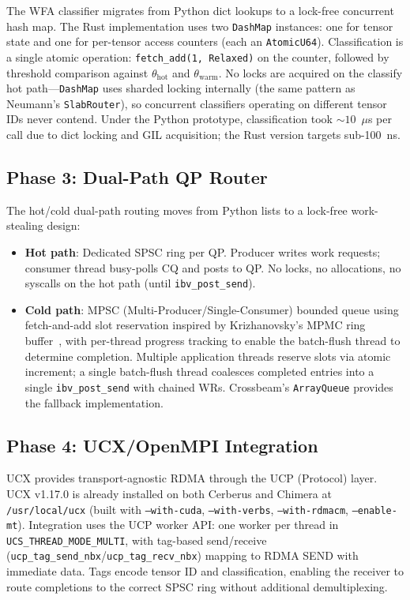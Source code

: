 \documentclass[11pt,letterpaper]{article}
\begin{document}
The WFA classifier migrates from Python dict lookups to a lock-free concurrent hash map. The Rust implementation uses two \texttt{DashMap} instances: one for tensor state and one for per-tensor access counters (each an \texttt{AtomicU64}). Classification is a single atomic operation: \texttt{fetch\_add(1, Relaxed)} on the counter, followed by threshold comparison against $\theta_{\text{hot}}$ and $\theta_{\text{warm}}$. No locks are acquired on the classify hot path---\texttt{DashMap} uses sharded locking internally (the same pattern as Neumann's \texttt{SlabRouter}), so concurrent classifiers operating on different tensor IDs never contend. Under the Python prototype, classification took ${\sim}10$~$\mu$s per call due to dict locking and GIL acquisition; the Rust version targets sub-100~ns.

\subsection{Phase 3: Dual-Path QP Router}

The hot/cold dual-path routing moves from Python lists to a lock-free work-stealing design:

\begin{itemize}
    \item \textbf{Hot path}: Dedicated SPSC ring per QP. Producer writes work requests; consumer thread busy-polls CQ and posts to QP. No locks, no allocations, no syscalls on the hot path (until \texttt{ibv\_post\_send}).

    \item \textbf{Cold path}: MPSC (Multi-Producer/Single-Consumer) bounded queue using fetch-and-add slot reservation inspired by Krizhanovsky's MPMC ring buffer~\cite{krizhanovsky-mpmc}, with per-thread progress tracking to enable the batch-flush thread to determine completion. Multiple application threads reserve slots via atomic increment; a single batch-flush thread coalesces completed entries into a single \texttt{ibv\_post\_send} with chained WRs. Crossbeam's \texttt{ArrayQueue} provides the fallback implementation.
\end{itemize}

\subsection{Phase 4: UCX/OpenMPI Integration}

UCX provides transport-agnostic RDMA through the UCP (Protocol) layer. UCX v1.17.0 is already installed on both Cerberus and Chimera at \texttt{/usr/local/ucx} (built with \texttt{--with-cuda}, \texttt{--with-verbs}, \texttt{--with-rdmacm}, \texttt{--enable-mt}). Integration uses the UCP worker API: one worker per thread in \texttt{UCS\_THREAD\_MODE\_MULTI}, with tag-based send/receive (\texttt{ucp\_tag\_send\_nbx}/\texttt{ucp\_tag\_recv\_nbx}) mapping to RDMA SEND with immediate data. Tags encode tensor ID and classification, enabling the receiver to route completions to the correct SPSC ring without additional demultiplexing.
\end{document}
